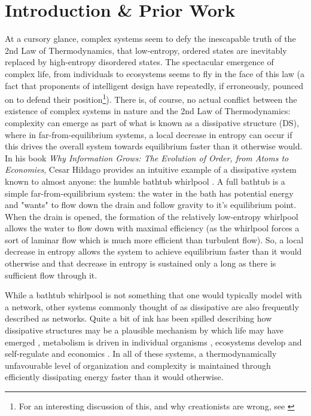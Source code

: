 \documentclass{paper}
\begin{document}
	\section{Introduction \& Prior Work}
	At a cursory glance, complex systems seem to defy the inescapable truth of the 2nd Law of Thermodynamics, that low-entropy, ordered states are inevitably replaced by high-entropy disordered states. The spectacular emergence of complex life, from individuals to ecosystems seems to fly in the face of this law (a fact that proponents of intelligent design have repeatedly, if erroneously, pounced on to defend their position\footnote{
		For an interesting discussion of this, and why creationists are wrong, see \cite{thwaites_biological_2008}}).  
	There is, of course, no actual conflict between the existence of complex systems in nature and the 2nd Law of Thermodynamics: complexity can emerge as part of what is known as a dissipative structure (DS), where in far-from-equilibrium systems, a local decrease in entropy can occur if this drives the overall system towards equilibrium faster than it otherwise would. In his book \textit{Why Information Grows: The Evolution of Order, from Atoms to Economies}, Cesar Hildago provides an intuitive example of a dissipative system known to almost anyone: the humble bathtub whirlpool \cite{hidalgo_why_2015}. A full bathtub is a simple far-from-equilibrium system: the water in the bath has potential energy and "wants" to flow down the drain and follow gravity to it's equilibrium point. When the drain is opened, the formation of the relatively low-entropy whirlpool allows the water to flow down with maximal efficiency (as the whirlpool forces a sort of laminar flow which is much more efficient than turbulent flow). So, a local decrease in entropy allows the system to achieve equilibrium faster than it would otherwise and that decrease in entropy is sustained only a long as there is sufficient flow through it. 
	
	While a bathtub whirlpool is not something that one would typically model with a network, other systems commonly thought of as dissipative are also frequently described as networks. Quite a bit of ink has been spilled describing how dissipative structures may be a plausible mechanism by which life may have emerged \cite{anderson_broken_1987,shvartsev_self-organizing_2009,serafino_abiogenesis_2016}, metabolism is driven in individual organisms \cite{toussaint_thermodynamics_1998,karsenti_self-organization_2008,de_la_fuente_metabolic_2014}, ecosystems develop and self-regulate \cite{segel_dissipative_1972,kay_nonequilibrium_1991} and economics \cite{chen_unity_2016}. In all of these systems, a thermodynamically unfavourable level of organization and complexity is maintained through efficiently dissipating energy faster than it would otherwise. 
	
\end{document}
